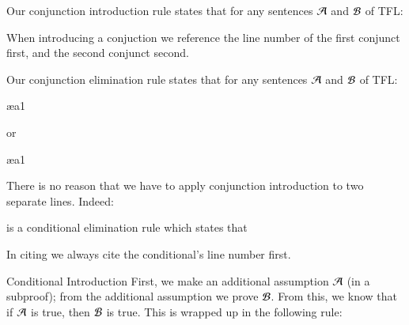 \begin{definition}
    Our conjunction introduction rule states that for any sentences $\mathcal{A}$ and $\mathcal{B}$ of TFL: \begin{fitchproof}
         
    \end{fitchproof}
    When introducing a conjuction we reference the line number of the first conjunct first, and the second conjunct second.
\end{definition}

\begin{definition}
    Our conjunction elimination rule states that for any sentences $\mathcal{A}$ and $\mathcal{B}$ of TFL: \begin{fitchproof}
         \ae{a1}
    \end{fitchproof}
    or \begin{fitchproof}
         \ae{a1}
    \end{fitchproof}
\end{definition}


\begin{remark}
    There is no reason that we have to apply conjunction introduction to two separate lines. Indeed: \begin{fitchproof}
         
    \end{fitchproof}
\end{remark}

\begin{definition}
     is a conditional elimination rule which states that \begin{fitchproof}
         
    \end{fitchproof}
    In citing we always cite the conditional's line number first.
\end{definition}

\begin{definition}{Conditional Introduction}
    First, we make an additional assumption $\mathcal{A}$ (in a subproof); from the additional assumption we prove $\mathcal{B}$. From this, we know that if $\mathcal{A}$ is true, then $\mathcal{B}$ is true. This is wrapped up in the following rule: \begin{fitchproof}
        \open
                \close
    \end{fitchproof}
\end{definition}


